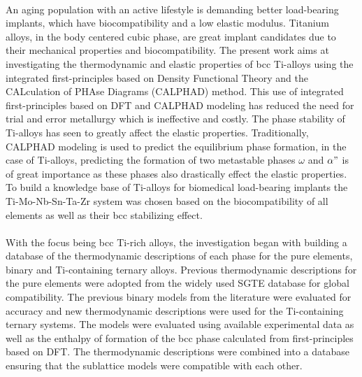 \paragraph*{} An aging population with an active lifestyle is demanding better load-bearing implants, which have biocompatibility and a low elastic modulus. Titanium alloys, in the body centered cubic phase, are great implant candidates due to their mechanical properties and biocompatibility. The present work aims at investigating the thermodynamic and elastic properties of bcc Ti-alloys using the integrated first-principles based on Density Functional Theory and the CALculation of PHAse Diagrams (CALPHAD) method. This use of integrated first-principles based on DFT and CALPHAD modeling has reduced the need for trial and error metallurgy which is ineffective and costly. The phase stability of Ti-alloys has seen to greatly affect the elastic properties. Traditionally, CALPHAD modeling is used to predict the equilibrium phase formation, in the case of Ti-alloys, predicting the formation of two metastable phases $\omega$ and $\alpha"$ is of great importance as these phases also drastically effect the elastic properties. To build a knowledge base of Ti-alloys for biomedical load-bearing implants the Ti-Mo-Nb-Sn-Ta-Zr system was chosen based on the biocompatibility of all elements as well as their bcc stabilizing effect.
\paragraph*{} With the focus being bcc Ti-rich alloys, the investigation began with building a database of the thermodynamic descriptions of each phase for the pure elements, binary and Ti-containing ternary alloys. Previous thermodynamic descriptions for the pure elements were adopted from the widely used SGTE database for global compatibility. The previous binary models from the literature were evaluated for accuracy and new thermodynamic descriptions were used for the Ti-containing ternary systems. The models were evaluated using available experimental data as well as the enthalpy of formation of the bcc phase calculated from first-principles based on DFT. The thermodynamic descriptions were combined into a database ensuring that the sublattice models were compatible with each other.
